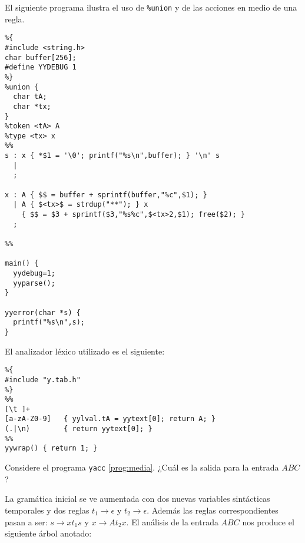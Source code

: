 \begin{program} El siguiente programa ilustra el uso de \verb|%union| y de las
acciones en medio de una regla.
\label{prog:media}
\begin{verbatim}
%{
#include <string.h>
char buffer[256];
#define YYDEBUG 1
%}
%union {
  char tA;
  char *tx;
}
%token <tA> A
%type <tx> x
%%
s : x { *$1 = '\0'; printf("%s\n",buffer); } '\n' s 
  |
  ;

x : A { $$ = buffer + sprintf(buffer,"%c",$1); }
  | A { $<tx>$ = strdup("**"); } x 
    { $$ = $3 + sprintf($3,"%s%c",$<tx>2,$1); free($2); }
  ;

%%

main() {
  yydebug=1;
  yyparse();
}

yyerror(char *s) {
  printf("%s\n",s);
}
\end{verbatim}
\end{program}

\begin{program} El analizador léxico utilizado es el siguiente:
\begin{verbatim}
%{
#include "y.tab.h"
%}
%%
[\t ]+
[a-zA-Z0-9]   { yylval.tA = yytext[0]; return A; }
(.|\n)        { return yytext[0]; }
%%
yywrap() { return 1; }
\end{verbatim}
\end{program}

\begin{example}
Considere el programa \verb|yacc| \ref{prog:media}. ¿Cuál es la salida para la entrada 
$ABC$?

La gramática inicial se ve aumentada con dos nuevas variables sintácticas temporales
y dos reglas $t_1 \rightarrow \epsilon$ y $t_2 \rightarrow \epsilon$. Además las reglas
correspondientes pasan a ser: $s \rightarrow x t_1 s$ y $x \rightarrow A t_2 x$. El análisis 
de la entrada $ABC$ nos produce el siguiente árbol anotado:

\end{example}

